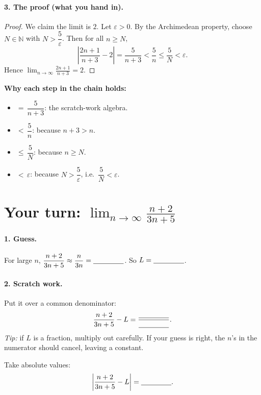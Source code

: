 \documentclass[11pt]{article}
\newcommand{\blank}{\underline{\hspace{1.5cm}}}
\begin{document}
\paragraph{3. The proof (what you hand in).}
\begin{proof}
We claim the limit is $2$. Let $\varepsilon>0$. By the Archimedean
property, choose $N\in\mathbb{N}$ with $N>\dfrac{5}{\varepsilon}$. Then
for all $n\ge N$,
\[
  \left|\frac{2n+1}{n+3}-2\right|
  = \frac{5}{n+3}
  < \frac{5}{n}
  \le \frac{5}{N}
  < \varepsilon .
\]
Hence $\displaystyle\lim_{n\to\infty}\frac{2n+1}{n+3}=2$.
\end{proof}

\noindent\textbf{Why each step in the chain holds:}
\begin{itemize}
  \item $=\,\dfrac{5}{n+3}$: the scratch-work algebra.
  \item $<\,\dfrac{5}{n}$: because $n+3>n$.
  \item $\le\,\dfrac{5}{N}$: because $n\ge N$.
  \item $<\,\varepsilon$: because $N>\dfrac{5}{\varepsilon}$, i.e.\
        $\dfrac{5}{N}<\varepsilon$.
\end{itemize}

\newpage
\section*{Your turn: $\displaystyle\lim_{n\to\infty}\frac{n+2}{3n+5}$}

\paragraph{1. Guess.} For large $n$,
$\dfrac{n+2}{3n+5}\approx\dfrac{n}{3n}=\blank$. So $L=\blank$.

\paragraph{2. Scratch work.} Put it over a common denominator:
\[
  \frac{n+2}{3n+5}-L = \frac{\blank}{\blank}.
\]
\emph{Tip:} if $L$ is a fraction, multiply out carefully. If your guess
is right, the $n$'s in the numerator should cancel, leaving a constant.

\vspace{2cm}

Take absolute values:
\[
  \left|\frac{n+2}{3n+5}-L\right| = \blank .
\]
\end{document}
